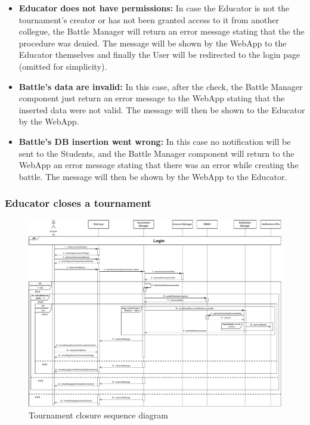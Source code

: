 \documentclass{article}
\begin{document}
{        \begin{itemize}
            \item \textbf{Educator does not have permissions:} In case the Educator is not the 
            tournament's creator or has not been granted access to it from another collegue, 
            the Battle Manager will return an error message stating that the the procedure was 
            denied. 
            The message will be shown by the WebApp to the Educator themselves and finally
            the User will be redirected to the login page (omitted for simplicity).
            \item \textbf{Battle's data are invalid:} In this case, after the check, the Battle 
            Manager component just return an error message to the WebApp stating that the 
            inserted data were not valid. The message will then be shown to the Educator by 
            the WebApp.
            \item \textbf{Battle's DB insertion went wrong:} In this case no 
            notification will be sent to the Students, and the Battle Manager component will 
            return to the WebApp an error message stating that there was an error while 
            creating the battle.
            The message will then be shown by the WebApp to the Educator.
        \end{itemize}


    \subsubsection{Educator closes a tournament}
        \begin{figure}[H]
            \centering
            \hspace*{-4cm}\includegraphics[scale=0.65]{Sequence/Sequence7DD.pdf}
            \caption{Tournament closure sequence diagram}
            \label{fig:Sequence7DD}
        \end{figure}

}
\end{document}
